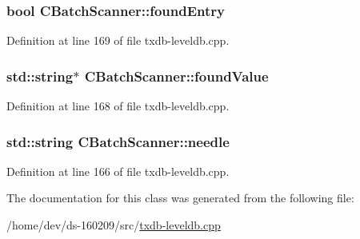 \subsubsection[{found\+Entry}]{\setlength{\rightskip}{0pt plus 5cm}bool C\+Batch\+Scanner\+::found\+Entry}\label{class_c_batch_scanner_ad2669c1d3fbd8c206b1f42348dde8cf0}


Definition at line 169 of file txdb-\/leveldb.\+cpp.

\hypertarget{class_c_batch_scanner_a3a82f2f7068f469eb535435a0b9ae640}{}
\subsubsection[{found\+Value}]{\setlength{\rightskip}{0pt plus 5cm}std\+::string$\ast$ C\+Batch\+Scanner\+::found\+Value}\label{class_c_batch_scanner_a3a82f2f7068f469eb535435a0b9ae640}


Definition at line 168 of file txdb-\/leveldb.\+cpp.

\hypertarget{class_c_batch_scanner_ae04f7151c91676f9f6209737cdc3d086}{}
\subsubsection[{needle}]{\setlength{\rightskip}{0pt plus 5cm}std\+::string C\+Batch\+Scanner\+::needle}\label{class_c_batch_scanner_ae04f7151c91676f9f6209737cdc3d086}


Definition at line 166 of file txdb-\/leveldb.\+cpp.



The documentation for this class was generated from the following file\+:\begin{DoxyCompactItemize}
\item 
/home/dev/ds-\/160209/src/\hyperlink{txdb-leveldb_8cpp}{txdb-\/leveldb.\+cpp}\end{DoxyCompactItemize}
